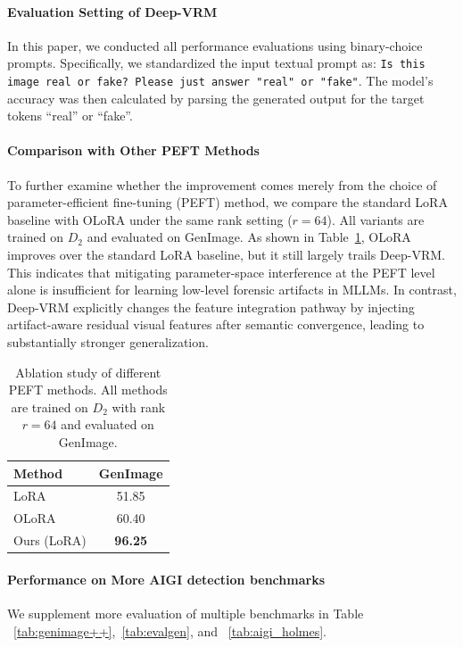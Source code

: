 \documentclass{article}
\theoremstyle{plain}
\theoremstyle{definition}
\theoremstyle{remark}
\begin{document}
\paragraph{Evaluation Setting of Deep-VRM}
In this paper, we conducted all performance evaluations using binary-choice prompts. Specifically, we standardized the input textual prompt as: \texttt{Is this image real or fake? Please just answer "real" or "fake"}. The model's accuracy was then calculated by parsing the generated output for the target tokens ``real'' or ``fake''.

\paragraph{Comparison with Other PEFT Methods}
To further examine whether the improvement comes merely from the choice of parameter-efficient fine-tuning (PEFT) method, we compare the standard LoRA baseline with OLoRA under the same rank setting ($r=64$). All variants are trained on $D_2$ and evaluated on GenImage. As shown in Table~\ref{tab:peft_appendix}, OLoRA improves over the standard LoRA baseline, but it still largely trails Deep-VRM. This indicates that mitigating parameter-space interference at the PEFT level alone is insufficient for learning low-level forensic artifacts in MLLMs. In contrast, Deep-VRM explicitly changes the feature integration pathway by injecting artifact-aware residual visual features after semantic convergence, leading to substantially stronger generalization.

\begin{table}[h]
  \centering
  \caption{Ablation study of different PEFT methods. All methods are trained on $D_2$ with rank $r=64$ and evaluated on GenImage.}
  \label{tab:peft_appendix}
  \begin{tabular}{l|c}
    \toprule
    \textbf{Method} & \textbf{GenImage} \\
    \midrule
    LoRA & 51.85 \\
    OLoRA & 60.40 \\
    Ours (LoRA) & \textbf{96.25} \\
    \bottomrule
  \end{tabular}
\end{table}

\paragraph{Performance on More AIGI detection benchmarks}
We supplement more evaluation of multiple benchmarks in Table ~\ref{tab:genimage++},~\ref{tab:evalgen}, and ~\ref{tab:aigi_holmes}.
\end{document}
